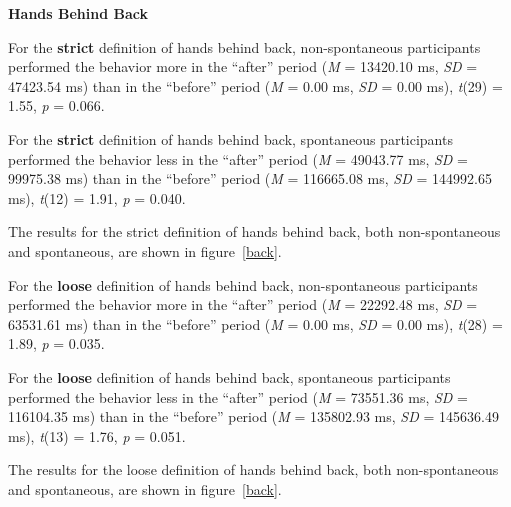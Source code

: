 \documentclass{acm_proc_article-sp}
\begin{document}
\textbf{Hands Behind Back}

For the \textbf{strict} definition of hands behind back, non-spontaneous participants performed the behavior more in the ``after'' period (\textit{M} = 13420.10 ms, \textit{SD} = 47423.54 ms) than in the ``before'' period (\textit{M} = 0.00 ms, \textit{SD} = 0.00 ms), \textit{t}(29) = 1.55, \textit{p} = 0.066.

For the \textbf{strict} definition of hands behind back, spontaneous participants performed the behavior less in the ``after'' period (\textit{M} = 49043.77 ms, \textit{SD} = 99975.38 ms) than in the ``before'' period (\textit{M} = 116665.08 ms, \textit{SD} = 144992.65 ms), \textit{t}(12) = 1.91, \textit{p} = 0.040.

The results for the strict definition of hands behind back, both non-spontaneous and spontaneous, are shown in figure~\ref{back}.

For the \textbf{loose} definition of hands behind back, non-spontaneous participants performed the behavior more in the ``after'' period (\textit{M} = 22292.48 ms, \textit{SD} = 63531.61 ms) than in the ``before'' period (\textit{M} = 0.00 ms, \textit{SD} = 0.00 ms), \textit{t}(28) = 1.89, \textit{p} = 0.035.

For the \textbf{loose} definition of hands behind back, spontaneous participants performed the behavior less in the ``after'' period (\textit{M} = 73551.36 ms, \textit{SD} = 116104.35 ms) than in the ``before'' period (\textit{M} = 135802.93 ms, \textit{SD} = 145636.49 ms), \textit{t}(13) = 1.76, \textit{p} = 0.051.

The results for the loose definition of hands behind back, both non-spontaneous and spontaneous, are shown in figure~\ref{back}.
\end{document}
